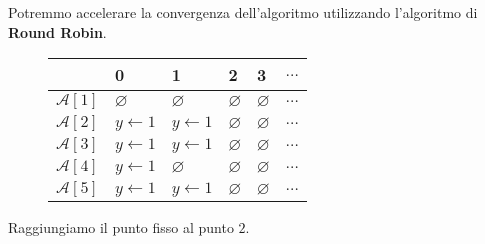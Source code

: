 Potremmo accelerare la convergenza dell'algoritmo utilizzando l'algoritmo di \textbf{Round Robin}.
\begin{figure}[H]
    \centering
    \renewcommand{\arraystretch}{2}
    \begin{tabular}{|>{\centering\arraybackslash}m{5em}|m{5em}|m{5em}|m{5em}|m{5em}|m{5em}|}
        \hline
        & \textbf{0} & \textbf{1} & \textbf{2} & \textbf{3} & \textbf{$\dots$} \\
        \hline
        $\mathcal{A}[1]$ & $\varnothing$ & $\varnothing$ & $\varnothing$ & $\varnothing$ & $\dots$ \\
        \hline
        $\mathcal{A}[2]$ & $y \gets 1$ & $y \gets 1$ & $\varnothing$ 
        & $\varnothing$ & $\dots$ \\
        \hline
        $\mathcal{A}[3]$ & $y \gets 1$ & $y \gets 1$ & $\varnothing$ & $\varnothing$ & $\dots$ \\
        \hline
        $\mathcal{A}[4]$ & $y \gets 1$ &$\varnothing$ & $\varnothing$ & $\varnothing$ & $\dots$ \\
        \hline
        $\mathcal{A}[5]$ & $y \gets 1$ &$y \gets 1$ & $\varnothing$ & $\varnothing$ & $\dots$ \\
        \hline
    \end{tabular}
\end{figure}
Raggiungiamo il punto fisso al punto $2$.